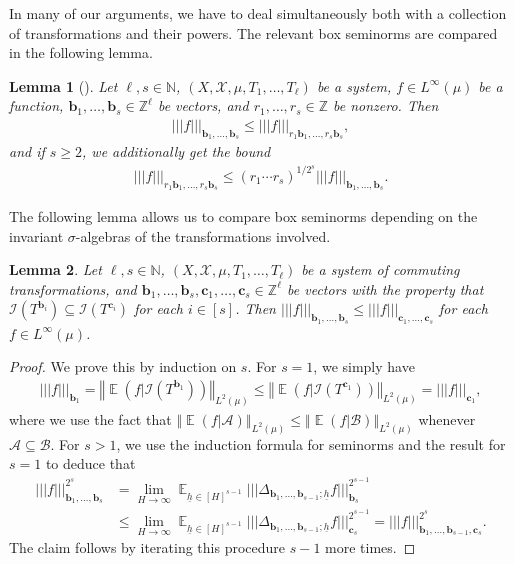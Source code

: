 \documentclass[11pt]{amsart}
\newtheorem{lemma}{Lemma}[section]
\theoremstyle{definition}
\newcommand{\N}{{\mathbb N}}
\newcommand{\Z}{{\mathbb Z}}
\newcommand{\CA}{{\mathcal A}}
\newcommand{\CB}{{\mathcal B}}
\newcommand{\CI}{{\mathcal I}}
\newcommand{\CX}{{\mathcal X}}
\newcommand{\bc}{{\mathbf{c}}}
\renewcommand{\b}{{\textbf{b}}}
\newcommand{\uh}{{\underline{h}}}
\newcommand{\norm}[1]{\left\Vert #1\right\Vert}
\newcommand{\nnorm}[1]{\lvert\!|\!| #1|\!|\!\rvert}
\DeclareMathOperator*{\E}{\mathbb{E}}
\begin{document}
In many of our arguments, we have to deal simultaneously both with a collection of transformations and their powers. The relevant box seminorms are compared in the following lemma.
\begin{lemma}[{\cite[Lemma 3.1]{FrKu22}}]\label{L:seminorm of power}
    Let $\ell,s\in\N$, $(X, \CX, \mu, T_1, \ldots, T_\ell)$ be a system, $f\in L^\infty(\mu)$ be a function, $\b_1, \ldots, \b_s\in\Z^\ell$ be vectors, and $r_1, \ldots, r_s\in\Z$ be nonzero. Then
    \begin{align*}%
       \nnorm{f}_{\b_1, \ldots, \b_s}\leq \nnorm{f}_{r_1 \b_1, \ldots, r_s \b_s},
    \end{align*}
    and if $s\geq 2$, we additionally get the bound
    \begin{align*}%
        \nnorm{f}_{r_1 \b_1, \ldots, r_s \b_s} \leq (r_1\cdots r_s)^{1/2^{s}}\nnorm{f}_{\b_1, \ldots, \b_s}.
    \end{align*}
\end{lemma}

The following lemma allows us to compare box seminorms depending on the invariant $\sigma$-algebras of the transformations involved.
\begin{lemma}\label{bounding seminorms}
Let $\ell,s\in\N$, $(X, \CX, \mu, T_1, \ldots, T_\ell)$ be a system of commuting transformations, and $\b_1, \ldots, \b_s, \bc_1, \ldots, \bc_s\in\Z^\ell$ be vectors with the property that $\CI(T^{\b_i})\subseteq \CI(T^{\bc_i})$
for each $i\in[s]$. Then $\nnorm{f}_{\b_1, \ldots, \b_s}\leq \nnorm{f}_{\bc_1, \ldots, \bc_s}$ for each $f\in L^\infty(\mu)$.
\end{lemma}
\begin{proof}
We prove this by induction on $s$. For $s=1$, we simply have
\begin{align*}
    \nnorm{f}_{\b_1}=\norm{\E(f|\CI(T^{\b_1}))}_{L^2(\mu)}\leq \norm{\E(f|\CI(T^{\bc_1}))}_{L^2(\mu)} = \nnorm{f}_{\bc_1},
\end{align*}
where we use the fact that $\norm{\E(f|\CA)}_{L^2(\mu)}\leq\norm{\E(f|\CB)}_{L^2(\mu)}$ whenever $\CA\subseteq\CB$.
For $s>1$, we use the induction formula for seminorms and the result for $s=1$ to deduce that
\begin{align*}
    \nnorm{f}_{\b_1, \ldots, \b_s}^{2^s} &=\lim_{H\to\infty}\E_{\uh\in[H]^{s-1}}\nnorm{\Delta_{\b_1, \ldots, \b_{s-1};\uh} f}_{\b_s}^{2^{s-1}}\\
    &\leq \lim_{H\to\infty}\E_{\uh\in[H]^{s-1}}\nnorm{\Delta_{\b_1, \ldots, \b_{s-1};\uh} f}_{\bc_s}^{2^{s-1}} = \nnorm{f}_{\b_1, \ldots, \b_{s-1}, \bc_s}^{2^s}.
\end{align*}
The claim follows by iterating this procedure $s-1$ more times.
\end{proof}
\end{document}
